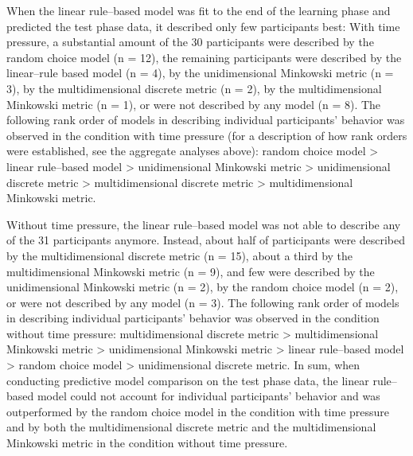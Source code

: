 \documentclass[a4paper,man,natbib]{apa6}
\begin{document}
When the linear rule--based model was fit to the end of the learning phase and predicted the test phase data, it described only few participants best: With time pressure, a substantial amount of the 30 participants were described by the random choice model (n = 12), the remaining participants were described by the linear--rule based model (n = 4), by the unidimensional Minkowski metric (n = 3), by the multidimensional discrete metric (n = 2), by the multidimensional Minkowski metric (n = 1), or were not described by any model (n = 8). The following rank order of models in describing individual participants' behavior was observed in the condition with time pressure (for a description of how rank orders were established, see the aggregate analyses above): random choice model > linear rule--based model > unidimensional Minkowski metric > unidimensional discrete metric > multidimensional discrete metric > multidimensional Minkowski metric. 

Without time pressure, the linear rule--based model was not able to describe any of the 31 participants anymore. Instead, about half of participants were described by the multidimensional discrete metric (n = 15), about a third by the multidimensional Minkowski metric (n = 9), and few were described by the unidimensional Minkowski metric (n = 2), by the random choice model (n = 2), or were not described by any model (n = 3). The following rank order of models in describing individual participants' behavior was observed in the condition without time pressure: multidimensional discrete metric > multidimensional Minkowski metric > unidimensional Minkowski metric > linear rule--based model > random choice model > unidimensional discrete metric. In sum, when conducting predictive model comparison on the test phase data, the linear rule--based model could not account for individual participants' behavior and was outperformed by the random choice model in the condition with time pressure and by both the multidimensional discrete metric and the multidimensional Minkowski metric in the condition without time pressure.

\end{document}

